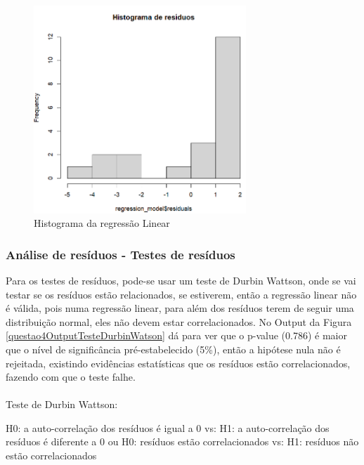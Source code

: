 \documentclass[%
 aip,
cp,  %
 amsmath,amssymb,%
 reprint,%
]{revtex4-2}
\begin{document}
\begin{figure}[!h]
    \centering
    \includegraphics[width=8cm]{imagens/questao4/questao4HistogramaResiduos.png}
    \caption{Histograma da regressão Linear}
    \label{questao4Histograma}
\end{figure}


\subsubsection{Análise de resíduos - Testes de resíduos}
Para os testes de resíduos, pode-se usar um teste de Durbin Wattson, onde se vai testar se os resíduos estão relacionados, se estiverem, então a regressão linear não é válida, pois numa regressão linear, para além dos resíduos terem de seguir uma distribuição normal, eles não devem estar correlacionados. No Output da Figura \ref{questao4OutputTesteDurbinWatson}  dá para ver que o p-value (0.786) é maior que o nível de significância pré-estabelecido (5\%), então a hipótese nula não é rejeitada, existindo evidências estatísticas que os resíduos estão correlacionados, fazendo com que o teste falhe. \\ \\
Teste de Durbin Wattson:

\begin{center}
    H0: a auto-correlação dos resíduos é igual a 0 
    \newline
    vs:
    \newline
    H1: a auto-correlação dos resíduos é diferente a 0 
    \newline
    \newline
    ou
    \newline
    \newline
    H0:  resíduos estão correlacionados 
    \newline
    vs:
    \newline
    H1: resíduos não estão correlacionados
    \newline
\end{center}
\end{document}
